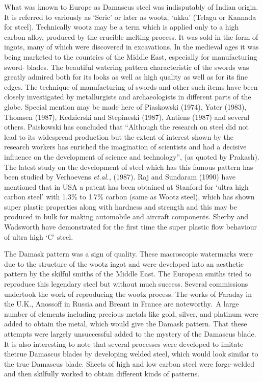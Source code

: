 What was known to Europe as Damascus steel was indisputably of Indian origin. It is referred to variously as ‘Seric’ or later as wootz, ‘ukku’ (Telagu or Kannada for steel). Technically woot­z may be a term which is applied only to a high carbon alloy, produced by the crucible melting process. It was sold in the form of ingots, many of which were discovered in excavations. In the medieval ages it was being marketed to the countries of the Middle East, especially for manufacturing sword- blades. The beautiful watering pattern characteristic of the swords was greatly admired both for its looks as well as high quality as well as for its fine edges. The technique of manufacturing of swords and other such items have been closely investigated by metallurgists and archaeologists in different parts of the globe. Special mention may be made here of Piaskowski (1974), Yater (1983), Thomsen (1987), Kedzierski and Stepineski (1987), Antiens (1987) and several others. Paiskowski has concluded that “Although the research on steel did not lead to its widespread production but the extent of interest shown by the research workers has enriched the imagination of scientists and had a decisive influence on the development of science and technology”, (as quoted by Prakash). The latest study on the development of steel which has this famous pattern has been studied by Verhoevens {\it et.al.,} (1987). Raj and Sundaram (1990) have mentioned that in USA a patent has been obtained at Stanford for ‘ultra high carbon steel’ with 1.3\% to 1.7\% carbon (same as Wootz steel), which has shown super plastic properties along with hardness and strength and this may be produced in bulk for making automobile and aircraft components. Sherby and Wadsworth have demonstrated for the first time the super plastic flow behaviour of ultra high `C' steel.

The Damask pattern was a sign of quality. These macroscopic watermarks were due to the structure of the wootz ingot and were developed into an aesthetic pattern by the skilful smiths of the Middle East. The European smiths tried to reproduce this legendary steel but without much success. Several commissions undertook the work of reproducing the wootz process. The works of Faraday in the U.K., Anossoff in Russia and Breant in France are noteworthy.~A large number of elements including precious metals like gold, silver, and platinum were added to obtain the metal, which would give the Damask pattern. That these attempts were largely unsuccessful added to the mystery of the Damascus blade. It is also interesting to note that several processes were developed to imitate the\break true Damascus blades by developing welded steel, which would look similar to the true Damascus blade. Sheets of high and low carbon steel were forge-welded and then skilfully worked to obtain different kinds of patterns. 

